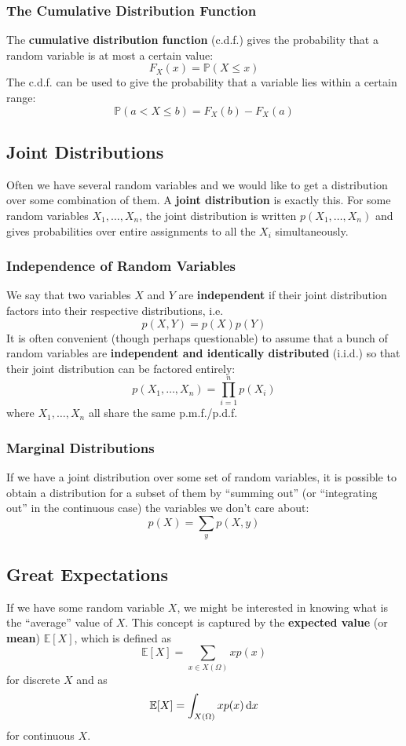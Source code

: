 \documentclass{article}
\newcommand{\pr}[1]{\mathbb{P}(#1)}
\renewcommand{\ev}[1]{\mathbb{E}[#1]}
\newcommand{\term}[1]{\textbf{#1}}
\begin{document}
\subsubsection{The Cumulative Distribution Function}
The \term{cumulative distribution function} (c.d.f.) gives the probability that a random variable is at most a certain value:
\[F_X(x) = \pr{X \leq x}\]
The c.d.f. can be used to give the probability that a variable lies within a certain range:
\[\pr{a < X \leq b} = F_X(b) - F_X(a)\]

\subsection{Joint Distributions}
Often we have several random variables and we would like to get a distribution over some combination of them. A \term{joint distribution} is exactly this. For some random variables $X_1, \dots, X_n$, the joint distribution is written $p(X_1, \dots, X_n)$ and gives probabilities over entire assignments to all the $X_i$ simultaneously.

\subsubsection{Independence of Random Variables}
We say that two variables $X$ and $Y$ are \term{independent} if their joint distribution factors into their respective distributions, i.e.
\[p(X, Y) = p(X)p(Y)\]
It is often convenient (though perhaps questionable) to assume that a bunch of random variables are \term{independent and identically distributed} (i.i.d.) so that their joint distribution can be factored entirely:
\[p(X_1, \dots, X_n) = \prod_{i=1}^n p(X_i)\]
where $X_1, \dots, X_n$ all share the same p.m.f./p.d.f.

\subsubsection{Marginal Distributions}
If we have a joint distribution over some set of random variables, it is possible to obtain a distribution for a subset of them by ``summing out'' (or ``integrating out'' in the continuous case) the variables we don't care about:
\[p(X) = \sum_{y} p(X, y)\]

\subsection{Great Expectations}
If we have some random variable $X$, we might be interested in knowing what is the ``average'' value of $X$. This concept is captured by the \term{expected value} (or \term{mean}) $\ev{X}$, which is defined as
\[\ev{X} = \sum_{x \in X(\Omega)} xp(x)\]
for discrete $X$ and as
\[\ev{X} = \int_{X(\Omega)} xp(x)\dif{x}\]
for continuous $X$.
\end{document}
